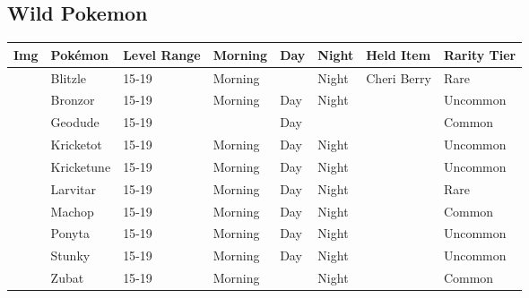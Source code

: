 \subsection{Wild Pokemon}%
\label{subsec:WildPokemon}%
\begin{longtable}{||l l l l l l l l||}%
\hline%
Img&Pokémon&Level Range&Morning&Day&Night&Held Item&Rarity Tier\\%
\hline%
\endhead%
\hline%
&Blitzle&15{-}19&Morning&&Night&Cheri Berry&Rare\\%
\hline%
&Bronzor&15{-}19&Morning&Day&Night&&Uncommon\\%
\hline%
&Geodude&15{-}19&&Day&&&Common\\%
\hline%
&Kricketot&15{-}19&Morning&Day&Night&&Uncommon\\%
\hline%
&Kricketune&15{-}19&Morning&Day&Night&&Uncommon\\%
\hline%
&Larvitar&15{-}19&Morning&Day&Night&&Rare\\%
\hline%
&Machop&15{-}19&Morning&Day&Night&&Common\\%
\hline%
&Ponyta&15{-}19&Morning&Day&Night&&Uncommon\\%
\hline%
&Stunky&15{-}19&Morning&Day&Night&&Uncommon\\%
\hline%
&Zubat&15{-}19&Morning&&Night&&Common\\%
\hline%
\end{longtable}